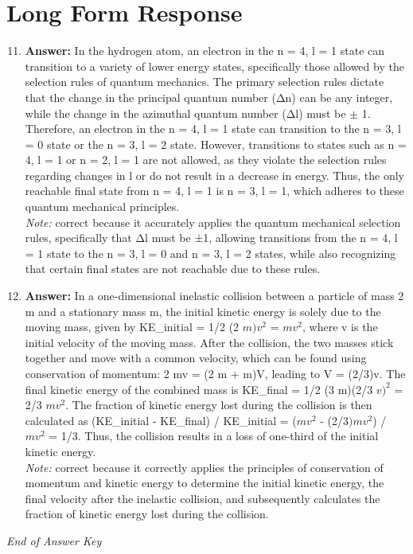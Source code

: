 \documentclass[12pt]{article}
\begin{document}
\section*{Long Form Response}
\begin{enumerate}[label=\arabic*.]
\setcounter{enumi}{10}
\item \textbf{Answer:} In the hydrogen atom, an electron in the n = 4, l = 1 state can transition to a variety of lower energy states, specifically those allowed by the selection rules of quantum mechanics. The primary selection rules dictate that the change in the principal quantum number (Δn) can be any integer, while the change in the azimuthal quantum number (Δl) must be \ensuremath{\pm} 1. Therefore, an electron in the n = 4, l = 1 state can transition to the n = 3, l = 0 state or the n = 3, l = 2 state. However, transitions to states such as n = 4, l = 1 or n = 2, l = 1 are not allowed, as they violate the selection rules regarding changes in l or do not result in a decrease in energy. Thus, the only reachable final state from n = 4, l = 1 is n = 3, l = 1, which adheres to these quantum mechanical principles.
\\ \textit{Note:} correct because it accurately applies the quantum mechanical selection rules, specifically that Δl must be ±1, allowing transitions from the n = 4, l = 1 state to the n = 3, l = 0 and n = 3, l = 2 states, while also recognizing that certain final states are not reachable due to these rules.
\item \textbf{Answer:} In a one-dimensional inelastic collision between a particle of mass 2 m and a stationary mass m, the initial kinetic energy is solely due to the moving mass, given by KE\_initial = 1/2 (2 $m)v^2$ = $mv^2$, where v is the initial velocity of the moving mass. After the collision, the two masses stick together and move with a common velocity, which can be found using conservation of momentum: 2 mv = (2 m + m)V, leading to V = (2/3)v. The final kinetic energy of the combined mass is KE\_final = 1/2 (3 m)(2/3 $v)^2$ = 2/3 $mv^2$. The fraction of kinetic energy lost during the collision is then calculated as (KE\_initial - KE\_final) / KE\_initial = ($mv^2$ - (2/$3)mv^2$) / $mv^2$ = 1/3. Thus, the collision results in a loss of one-third of the initial kinetic energy.
\\ \textit{Note:} correct because it correctly applies the principles of conservation of momentum and kinetic energy to determine the initial kinetic energy, the final velocity after the inelastic collision, and subsequently calculates the fraction of kinetic energy lost during the collision.
\end{enumerate}

\vfill
\noindent\textit{End of Answer Key}
\end{document}

